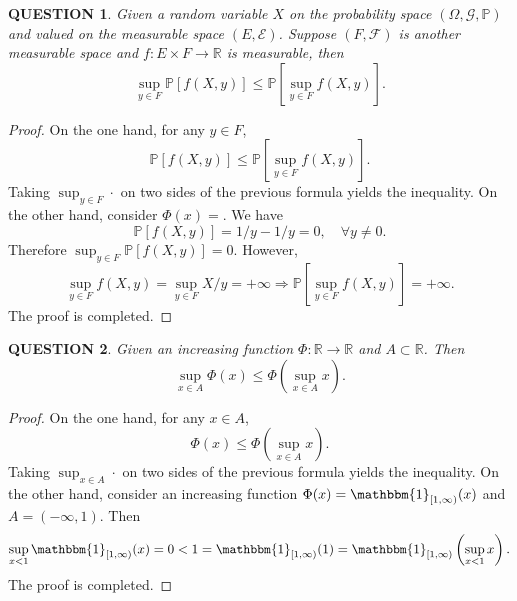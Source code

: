 \documentclass[12pt]{article}
\renewcommand{\(}{\left(}%
\renewcommand{\)}{\right)}%
\renewcommand{\[}{\left[}%
\renewcommand{\]}{\right]}%
\renewcommand{\r}{\mathbb{R}}
\newcommand{\p}{\mathbb{P}}
\newcommand{\f}{\mathscr{F}}
\newcommand{\e}{\mathscr{E}}
\newcommand{\g}{\mathscr{G}}
\newtheorem{question}{QUESTION}[section]}
\newtheorem{proof}{Proof.}}
\begin{document}
\begin{question}
	Given a random variable $X$ on the probability space $(\Omega,\g,\p)$ and valued on the measurable space $(E,\e)$. Suppose $(F,\f)$ is another measurable space and $f:E\times F\to \r$ is measurable, then
	\begin{equation*}
		\sup_{y\in F}\p [f(X,y)]\leq\p \[\sup_{y\in F}f(X,y)\].
	\end{equation*}
\end{question}
\begin{proof}
	On the one hand, for any $y\in F$,
	\begin{equation*}
		\p [f(X,y)]\leq \p \[\sup_{y\in F}f(X,y)\].
	\end{equation*}
	Taking $\sup_{y\in F}\cdot$ on two sides of the previous formula yields the inequality. On the other hand, consider $\Phi(x)=$. We have 
	\begin{equation*}
		\p[f(X,y)]=1/y-1/y=0,\quad \forall y\neq 0.
	\end{equation*}
	Therefore $\sup_{y\in F}\p [f(X,y)]=0$. However, 
	\begin{equation*}
		\sup_{y\in F}f(X,y)=\sup_{y\in F}X/y=+\infty\Longrightarrow \p \[\sup_{y\in F}f(X,y)\]=+\infty.
	\end{equation*}
	The proof is completed.
\end{proof}

\begin{question}
	Given an increasing function $\Phi:\r\to \r$ and $A\subset \r$. Then
	\begin{equation*}
		\sup_{x\in A}\Phi(x) \leq\Phi\(\sup_{x\in A}x\) .
	\end{equation*}
\end{question}
\begin{proof}
	On the one hand, for any $x\in A$,
	\begin{equation*}
		\Phi (x)\leq \Phi\(\sup_{x\in A}x\).
	\end{equation*}
	Taking $\sup_{x\in A}\cdot$ on two sides of the previous formula yields the inequality. On the other hand, consider an increasing function $\Phi(x)=\mathbbm{1}_{[1,\infty)}(x)$ and $A=(-\infty,1)$. Then 
	\begin{equation*}
		\sup_{x<1}\mathbbm{1}_{[1,\infty)}(x)=0<1=\mathbbm{1}_{[1,\infty)}(1)=\mathbbm{1}_{[1,\infty)}\(\sup_{x<1}x \).
	\end{equation*}
	The proof is completed.  
\end{proof}
\end{document}
